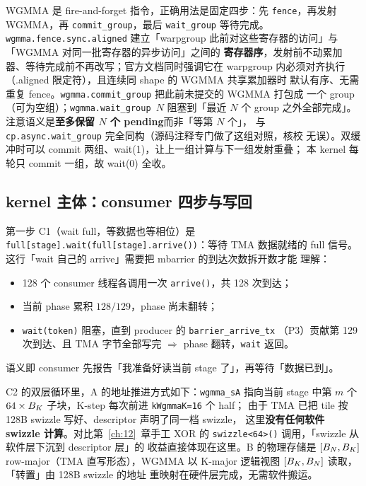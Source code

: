 WGMMA 是 fire-and-forget 指令，正确用法是固定四步：先 \texttt{fence}，再发射
WGMMA，再 \texttt{commit\_\allowbreak{}group}，最后 \texttt{wait\_group} 等待完成。
\texttt{wgmma.\allowbreak{}fence.\allowbreak{}sync.\allowbreak{}aligned}
建立「warpgroup 此前对这些寄存器的访问」与「WGMMA 对同一批寄存器的异步访问」之间的
\textbf{寄存器序}，发射前不动累加器、等待完成前不再改写；官方文档同时强调它在
warpgroup 内必须对齐执行（.aligned 限定符），且连续同 shape 的 WGMMA 共享累加器时
默认有序、无需重复 fence。\texttt{wgmma.\allowbreak{}commit\_\allowbreak{}group} 把此前未提交的 WGMMA 打包成
一个 group（可为空组）；\texttt{wgmma.\allowbreak{}wait\_\allowbreak{}group~$N$} 阻塞到「最近 $N$ 个 group
之外全部完成」。注意语义是\textbf{至多保留 $N$ 个 pending}而非「等第 $N$ 个」，
与 \texttt{cp.\allowbreak{}async.\allowbreak{}wait\_\allowbreak{}group} 完全同构（源码注释专门做了这组对照，核校
无误）。双缓冲时可以 commit 两组、wait(1)，让上一组计算与下一组发射重叠；
本 kernel 每轮只 commit 一组，故 wait(0) 全收。

\subsection{kernel 主体：consumer 四步与写回}

第一步 C1（wait full，等数据也等相位）是
\texttt{full[stage].wait(full[stage].arrive())}：等待 TMA 数据就绪的 full
信号。这行「wait 自己的 arrive」需要把 mbarrier 的到达次数拆开数才能
理解：
\begin{itemize}
  \item 128 个 consumer 线程各调用一次 \texttt{arrive()}，共 128 次到达；
  \item 当前 phase 累积 $128/129$，phase 尚未翻转；
  \item \texttt{wait(token)} 阻塞，直到 producer 的 \texttt{barrier\_arrive\_tx}
        （P3）贡献第 129 次到达、且 TMA 字节全部写完 $\Rightarrow$ phase
        翻转，\texttt{wait} 返回。
\end{itemize}
语义即 consumer 先报告「我准备好读当前 stage 了」，再等待「数据已到」。



C2 的双层循环里，A 的地址推进方式如下：\texttt{wgmma\_sA} 指向当前 stage 中第
$m$ 个 $64 \times B\sb{K}$ 子块，K-step 每次前进 \texttt{kWgmmaK=16} 个 half；
由于 TMA 已把 tile 按 128B swizzle 写好、descriptor 声明了同一档 swizzle，
这里\textbf{没有任何软件 swizzle 计算}。对比第~\ref{ch:12}~章手工 XOR 的
\texttt{swizzle\allowbreak{}<64>\allowbreak{}()} 调用，「swizzle 从软件层下沉到 descriptor 层」的
收益直接体现在这里。B 的物理存储是 $[B\sb{N}, B\sb{K}]$ row-major（TMA 直写形态），WGMMA
以 K-major 逻辑视图 $[B\sb{K}, B\sb{N}]$ 读取，「转置」由 128B swizzle 的地址
重映射在硬件层完成，无需软件搬运。

